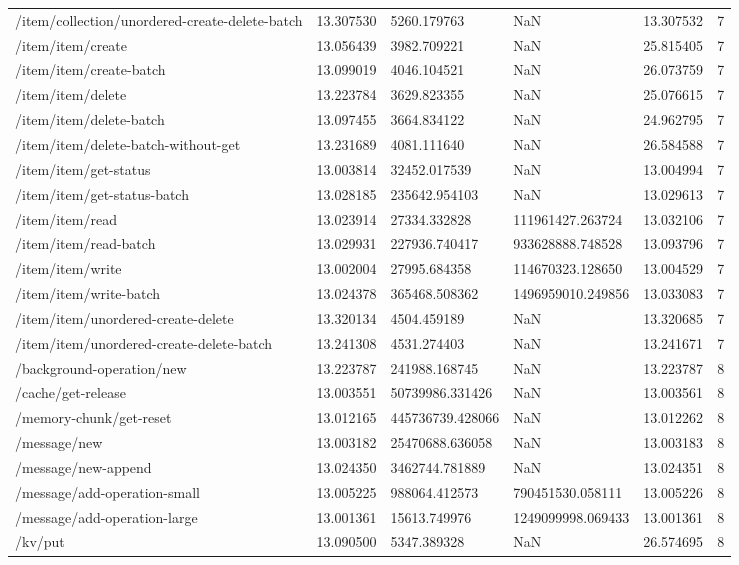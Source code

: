 \begin{tabularx}{\linewidth}{XXXXXX}
/item/collection/unordered-create-delete-batch & 13.307530 & 5260.179763 & NaN & 13.307532 & 7 \\
/item/item/create & 13.056439 & 3982.709221 & NaN & 25.815405 & 7 \\
/item/item/create-batch & 13.099019 & 4046.104521 & NaN & 26.073759 & 7 \\
/item/item/delete & 13.223784 & 3629.823355 & NaN & 25.076615 & 7 \\
/item/item/delete-batch & 13.097455 & 3664.834122 & NaN & 24.962795 & 7 \\
/item/item/delete-batch-without-get & 13.231689 & 4081.111640 & NaN & 26.584588 & 7 \\
/item/item/get-status & 13.003814 & 32452.017539 & NaN & 13.004994 & 7 \\
/item/item/get-status-batch & 13.028185 & 235642.954103 & NaN & 13.029613 & 7 \\
/item/item/read & 13.023914 & 27334.332828 & 111961427.263724 & 13.032106 & 7 \\
/item/item/read-batch & 13.029931 & 227936.740417 & 933628888.748528 & 13.093796 & 7 \\
/item/item/write & 13.002004 & 27995.684358 & 114670323.128650 & 13.004529 & 7 \\
/item/item/write-batch & 13.024378 & 365468.508362 & 1496959010.249856 & 13.033083 & 7 \\
/item/item/unordered-create-delete & 13.320134 & 4504.459189 & NaN & 13.320685 & 7 \\
/item/item/unordered-create-delete-batch & 13.241308 & 4531.274403 & NaN & 13.241671 & 7 \\
/background-operation/new & 13.223787 & 241988.168745 & NaN & 13.223787 & 8 \\
/cache/get-release & 13.003551 & 50739986.331426 & NaN & 13.003561 & 8 \\
/memory-chunk/get-reset & 13.012165 & 445736739.428066 & NaN & 13.012262 & 8 \\
/message/new & 13.003182 & 25470688.636058 & NaN & 13.003183 & 8 \\
/message/new-append & 13.024350 & 3462744.781889 & NaN & 13.024351 & 8 \\
/message/add-operation-small & 13.005225 & 988064.412573 & 790451530.058111 & 13.005226 & 8 \\
/message/add-operation-large & 13.001361 & 15613.749976 & 1249099998.069433 & 13.001361 & 8 \\
/kv/put & 13.090500 & 5347.389328 & NaN & 26.574695 & 8 \\

\end{tabularx}
